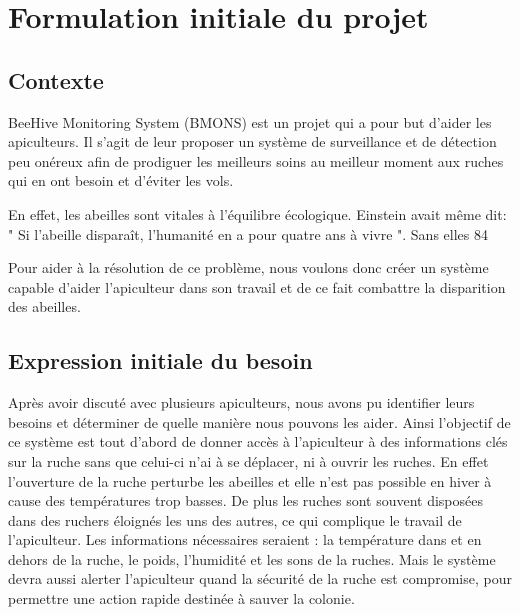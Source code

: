 \chapter{Formulation initiale du projet}



\section{Contexte}

BeeHive Monitoring System (BMONS) est un projet qui a pour but d'aider les apiculteurs. Il s'agit de leur proposer un système de surveillance et de détection peu onéreux afin de prodiguer les meilleurs soins au meilleur moment aux ruches qui en ont besoin et d'éviter les vols.

En effet, les abeilles sont vitales à l'équilibre écologique. Einstein avait même dit: " Si l’abeille disparaît, l’humanité en a pour quatre ans à vivre ". Sans elles 84 %

Pour aider à la résolution de ce problème, nous voulons donc créer un système capable d'aider l'apiculteur dans son travail et de ce fait combattre la disparition des abeilles. 

\section{Expression initiale du besoin}

Après avoir discuté avec plusieurs apiculteurs, nous avons pu identifier leurs besoins et déterminer de quelle manière nous pouvons les aider. Ainsi l'objectif de ce système est tout d'abord de donner accès à l'apiculteur à des informations clés sur la ruche sans que celui-ci n'ai à se déplacer, ni à ouvrir les ruches. En effet l'ouverture de la ruche perturbe les abeilles et elle n'est pas possible en hiver à cause des températures trop basses. De plus les ruches sont souvent disposées dans des ruchers éloignés les uns des autres, ce qui complique le travail de l'apiculteur. Les informations nécessaires seraient : la température dans et en dehors de la ruche, le poids, l'humidité et les sons de la ruches. Mais le système devra aussi alerter l'apiculteur quand la sécurité de la ruche est compromise, pour permettre une action rapide destinée à sauver la colonie.

